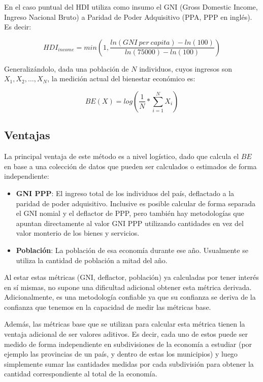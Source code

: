 En el caso puntual del HDI utiliza como insumo el GNI (Gross Domestic Income, Ingreso Nacional Bruto) a Paridad de Poder Adquisitivo (PPA, PPP en inglés). Es decir:

$$
    HDI_{income} = min(1, \frac{ln(GNI\ per\ capita) - ln(100)}{ln(75000)-ln(100)})
$$

Generalizándolo, dada una población de $N$ individuos, cuyos ingresos son $X_1, X_2, \dots, X_N$, la medición actual del bienestar económico es:

$$
    BE(X) = log(\frac{1}{N} * \sum_{i=1}^{N}X_i)
$$

\subsection{Ventajas}

La principal ventaja de este método es a nivel logístico, dado que calcula el $BE$ en base a una colección de datos que pueden ser calculados o estimados de forma independiente:

\begin{itemize}
    \item \textbf{GNI PPP}: El ingreso total de los individuos del país, deflactado a la paridad de poder adquisitivo. Inclusive es posible calcular de forma separada el GNI nomial y el deflactor de PPP, pero también hay metodologías que apuntan directamente al valor GNI PPP utilizando cantidades en vez del valor monterio de los bienes y servicios. 
    \item \textbf{Población}: La población de esa economía durante ese año. Usualmente se utiliza la cantidad de población a mitad del año.
\end{itemize}

Al estar estas métricas (GNI, deflactor, población) ya calculadas por tener interés en sí mismas, no supone una dificultad adicional obtener esta métrica derivada. Adicionalmente, es una metodología confiable ya que su confianza se deriva de la confianza que tenemos en la capacidad de medir las métricas base.

Además, las métricas base que se utilizan para calcular esta métrica tienen la ventaja adicional de ser valores aditivos. Es decir, cada uno de estos puede ser medido de forma independiente en subdivisiones de la economía a estudiar (por ejemplo las provincias de un país, y dentro de estas los municipios) y luego simplemente sumar las cantidades medidas por cada subdivisión para obtener la cantidad correspondiente al total de la economía. 

